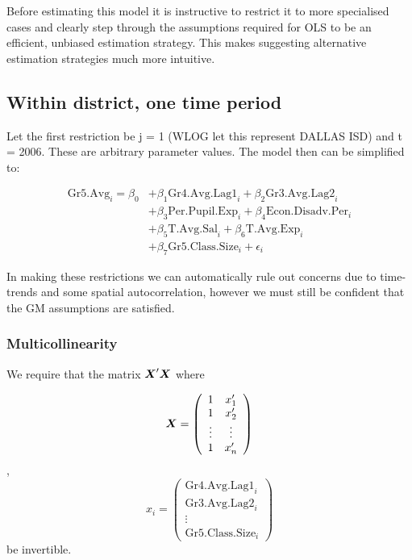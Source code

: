 \documentclass[11pt]{article}
\newcommand{\bX}{\mbox{\boldmath $X$}}
\begin{document}
Before estimating this model it is instructive to restrict it to more specialised cases and clearly step through the assumptions required for OLS to be an efficient, unbiased estimation strategy. This makes suggesting alternative estimation strategies much more intuitive.

\subsection{Within district, one time period}
\label{ss:nextsub1}

Let the first restriction be j = 1 (WLOG let this represent DALLAS ISD) and t = 2006. These are arbitrary parameter values. The model then can be simplified to:

\begin{align*}
\mathrm{Gr5.Avg}_{i} = \beta_{0} 
    &+ \beta_{1}  \mathrm{Gr4.Avg.Lag1}_{i} 
    + \beta_{2}  \mathrm{Gr3.Avg.Lag2}_{i}    \\
    &+ \beta_{3}  \mathrm{Per.Pupil.Exp}_{i} 
    + \beta_{4}  \mathrm{Econ.Disadv.Per}_{i} \\
    &+ \beta_{5}  \mathrm{T.Avg.Sal}_{i}   
    + \beta_{6}  \mathrm{T.Avg.Exp}_{i}  \\
    &+ \beta_{7}  \mathrm{Gr5.Class.Size}_{i} + \epsilon_{i}
\end{align*}

In making these restrictions we can automatically rule out concerns due to time-trends and some spatial autocorrelation, however we must still be confident that the GM assumptions are satisfied.

\subsubsection{Multicollinearity}

We require that the matrix $\bX'\bX$ where

$$\bX = \left( \begin{array}{cc}
1 & x_1' \\ 1 & x_2' \\ \vdots & \vdots \\ 1 & x_n' \end{array}
\right)$$,    
$$x_i = \left( \begin{array}{cc}
 \mathrm{Gr4.Avg.Lag1}_{i} \\  \mathrm{Gr3.Avg.Lag2}_{i} \\ \vdots \\ \mathrm{Gr5.Class.Size}_{i} \end{array}
\right)$$ be invertible. 
\end{document}
